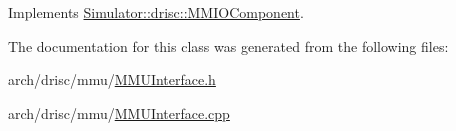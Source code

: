 Implements \hyperlink{class_simulator_1_1drisc_1_1_m_m_i_o_component_aab3662058e7a00109b122a1460188a8b}{Simulator\+::drisc\+::\+M\+M\+I\+O\+Component}.



The documentation for this class was generated from the following files\+:\begin{DoxyCompactItemize}
\item 
arch/drisc/mmu/\hyperlink{_m_m_u_interface_8h}{M\+M\+U\+Interface.\+h}\item 
arch/drisc/mmu/\hyperlink{_m_m_u_interface_8cpp}{M\+M\+U\+Interface.\+cpp}\end{DoxyCompactItemize}
